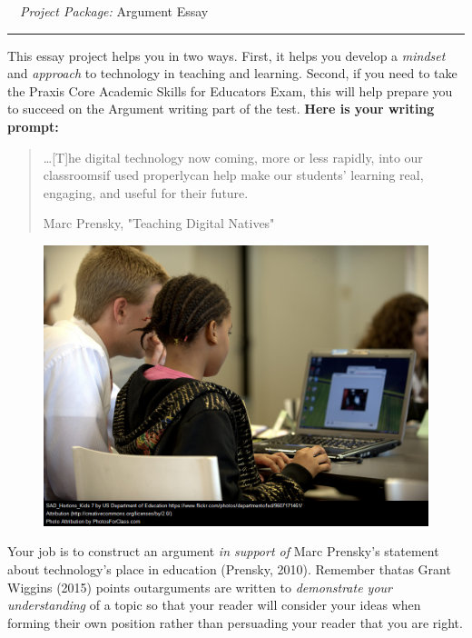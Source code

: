 \documentclass[12pt]{article}
\newcommand{\dueDate}[1]{\textbf{\textcolor{fsuMaroon}{#1}}}
\begin{document}
\begin{center}
\noindent\large\dueDate{\faBriefcase}~~\textsf{\textit{Project Package:} Argument Essay}\normalsize\\
\rule{4in}{1pt}
\end{center}

This essay project helps you in two ways. First, it helps you develop a \emph{mindset} and \emph{approach} to technology in teaching and learning. Second, if you need to take the Praxis Core Academic Skills for Educators Exam, this will help prepare you to succeed on the Argument writing part of the test. \textbf{Here is your writing prompt:}

\begin{adjustwidth*}{4em}{2em}
\noindent\blockquote[Marc Prensky, "Teaching Digital Natives"]{\ldots[T]he digital technology now coming,  more or less rapidly, into our classrooms\textemdash{}if used properly\textemdash{}can help make our students’ learning real, engaging, and useful for their future.}
\end{adjustwidth*}

\begin{figure}
	\includegraphics[width=\linewidth]{graphics/computer-classroom.png}
\end{figure}


Your job is to construct an argument \emph{in support of} Marc Prensky’s statement about technology’s place in education (Prensky, 2010). Remember that\textemdash{}as Grant Wiggins (2015) points out\textemdash{}arguments are written to \emph{demonstrate your understanding} of a topic so that your reader will consider your ideas when forming their own position rather than persuading your reader that you are right.
\end{document}
